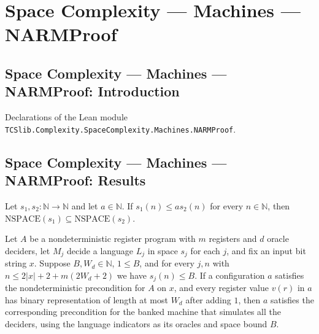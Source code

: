 \section{Space Complexity --- Machines --- NARMProof}
\subsection*{Space Complexity --- Machines --- NARMProof: Introduction}

Declarations of the Lean module \texttt{TCSlib.Complexity.SpaceComplexity.Machines.NARMProof}.

\subsection*{Space Complexity --- Machines --- NARMProof: Results}

\begin{theorem}
\label{Complexity.NSPACE.mono_const}
\leanok
{}
Let $s_1,s_2:\mathbb{N}\to\mathbb{N}$ and let $a\in\mathbb{N}$. If $s_1(n)\le a s_2(n)$
for every $n\in\mathbb{N}$, then $\mathrm{NSPACE}(s_1)\subseteq\mathrm{NSPACE}(s_2)$.
\end{theorem}

\begin{lemma}
\label{Complexity.LogProg.npre_of_npreS}
\leanok
{}
Let $A$ be a nondeterministic register program with $m$ registers and $d$ oracle
deciders, let $M_j$ decide a language $L_j$ in space $s_j$ for each $j$, and fix an
input bit string $x$. Suppose $B,W_d\in\mathbb N$, $1\le B$, and for every $j,n$ with
$n\le 2|x|+2+m(2W_d+2)$ we have $s_j(n)\le B$. If a configuration $a$ satisfies the
nondeterministic precondition for $A$ on $x$, and every register value $v(r)$ in $a$ has
binary representation of length at most $W_d$ after adding $1$, then $a$ satisfies the
corresponding precondition for the banked machine that simulates all the deciders, using
the language indicators as its oracles and space bound $B$.
\end{lemma}

